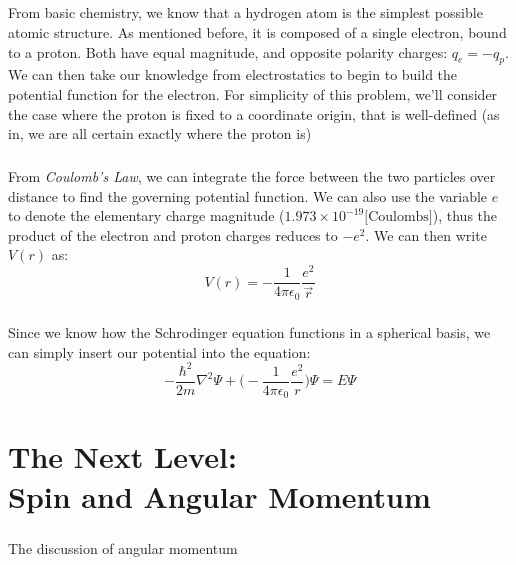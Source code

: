 \documentclass[12pt,letterpaper]{book}
\begin{document}
\paragraph*{}From basic chemistry, we know that a hydrogen atom is the simplest possible atomic structure. As mentioned before, it is composed of a single electron, bound to a proton. Both have equal magnitude, and opposite polarity charges: $q_e = -q_p$. We can then take our knowledge from electrostatics to begin to build the potential function for the electron. For simplicity of this problem, we'll consider the case where the proton is fixed to a coordinate origin, that is well-defined (as in, we are all certain exactly where the proton is)
\paragraph*{}From \textit{Coulomb's Law}, we can integrate the force between the two particles over distance to find the governing potential function. 
We can also use the variable $e$ to denote the elementary charge magnitude ($1.973 \times 10^{-19} \text{[Coulombs]}$), thus the product of the electron and proton charges reduces to $-e^2$. We can then write $V(r)$ as:
\begin{equation}
V(r) = -\frac{1}{4\pi\epsilon_0}\frac{e^2}{\vec{r}}
\end{equation}
\paragraph*{}Since we know how the Schrodinger equation functions in a spherical basis, we can simply insert our potential into the equation:
\begin{equation}
-\frac{\hbar^2}{2m}\nabla^2\Psi + 
\Big(-\frac{1}{4\pi\epsilon_0}\frac{e^2}{r}\Big)\Psi = E\Psi
\end{equation}
\paragraph*{}


\chapter{The Next Level: \\ Spin and Angular Momentum}
\paragraph*{}The discussion of angular momentum 
\end{document}
